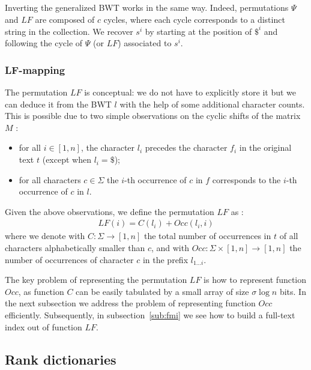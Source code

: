 
Inverting the generalized BWT works in the same way.
Indeed, permutations $\Psi$ and $LF$ are composed of $c$ cycles, where each cycle corresponds to a distinct string in the collection.
We recover $s^i$ by starting at the position of $\$^i$ and following the cycle of $\Psi$ (or $LF$) associated to $s^i$.

\subsubsection{LF-mapping}

The permutation $LF$ is conceptual: we do not have to explicitly store it but we can deduce it from the BWT $l$ with the help of some additional character counts.
This is possible due to two simple observations on the cyclic shifts of the matrix $M$ \citep{Burrows1994}:
\begin{itemize}
\item for all $i \in [1,n]$, the character $l_i$ precedes the character $f_i$ in the original text $t$ (except when $l_i = \$$);
\item for all characters $c \in \Sigma$ the $i$-th occurrence of $c$ in $f$ corresponds to the $i$-th occurrence of $c$ in $l$.
\end{itemize}
Given the above observations, we define the permutation $LF$ as \citep{Burrows1994,Ferragina2000}:
\begin{eqnarray}
LF(i) = C(l_i) + Occ(l_i, i)
\end{eqnarray}
where we denote with $C : \Sigma \rightarrow [1,n]$ the total number of occurrences in $t$ of all characters alphabetically smaller than $c$, and with $Occ :  \Sigma \times [1,n] \rightarrow [1,n]$ the number of occurrences of character $c$ in the prefix $l_{1 \dots i}$.

The key problem of representing the permutation $LF$ is how to represent function $Occ$, as function $C$ can be easily tabulated by a small array of size $\sigma \log{n}$ bits.
In the next subsection we address the problem of representing function $Occ$ efficiently. Subsequently, in subsection~\ref{sub:fmi} we see how to build a full-text index out of function $LF$.

\subsection{Rank dictionaries}

